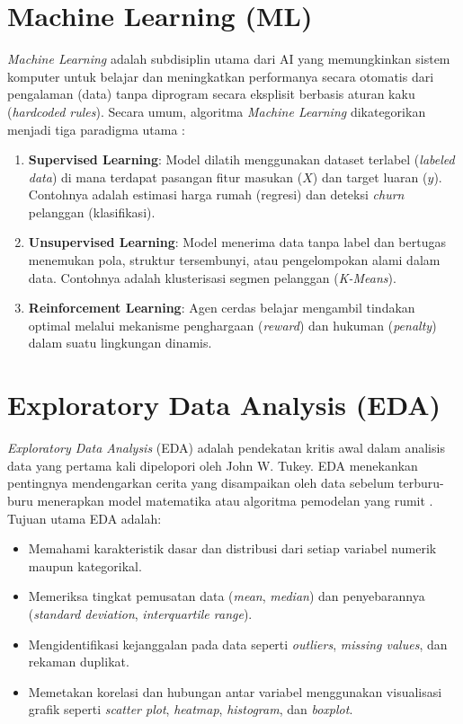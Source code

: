 \documentclass[a4paper,oneside,12pt]{report}
\begin{document}
\section{Machine Learning (ML)}
\textit{Machine Learning} adalah subdisiplin utama dari AI yang memungkinkan sistem komputer untuk belajar dan meningkatkan performanya secara otomatis dari pengalaman (data) tanpa diprogram secara eksplisit berbasis aturan kaku (\textit{hardcoded rules}). Secara umum, algoritma \textit{Machine Learning} dikategorikan menjadi tiga paradigma utama \cite{ref2}:
\begin{enumerate}
    \item \textbf{Supervised Learning}: Model dilatih menggunakan dataset terlabel (\textit{labeled data}) di mana terdapat pasangan fitur masukan ($X$) dan target luaran ($y$). Contohnya adalah estimasi harga rumah (regresi) dan deteksi \textit{churn} pelanggan (klasifikasi).
    \item \textbf{Unsupervised Learning}: Model menerima data tanpa label dan bertugas menemukan pola, struktur tersembunyi, atau pengelompokan alami dalam data. Contohnya adalah klusterisasi segmen pelanggan (\textit{K-Means}).
    \item \textbf{Reinforcement Learning}: Agen cerdas belajar mengambil tindakan optimal melalui mekanisme penghargaan (\textit{reward}) dan hukuman (\textit{penalty}) dalam suatu lingkungan dinamis.
\end{enumerate}

\section{Exploratory Data Analysis (EDA)}
\textit{Exploratory Data Analysis} (EDA) adalah pendekatan kritis awal dalam analisis data yang pertama kali dipelopori oleh John W. Tukey. EDA menekankan pentingnya mendengarkan cerita yang disampaikan oleh data sebelum terburu-buru menerapkan model matematika atau algoritma pemodelan yang rumit \cite{ref3,ref5}. Tujuan utama EDA adalah:
\begin{itemize}
    \item Memahami karakteristik dasar dan distribusi dari setiap variabel numerik maupun kategorikal.
    \item Memeriksa tingkat pemusatan data (\textit{mean}, \textit{median}) dan penyebarannya (\textit{standard deviation}, \textit{interquartile range}).
    \item Mengidentifikasi kejanggalan pada data seperti \textit{outliers}, \textit{missing values}, dan rekaman duplikat.
    \item Memetakan korelasi dan hubungan antar variabel menggunakan visualisasi grafik seperti \textit{scatter plot}, \textit{heatmap}, \textit{histogram}, dan \textit{boxplot}.
\end{itemize}
\end{document}
